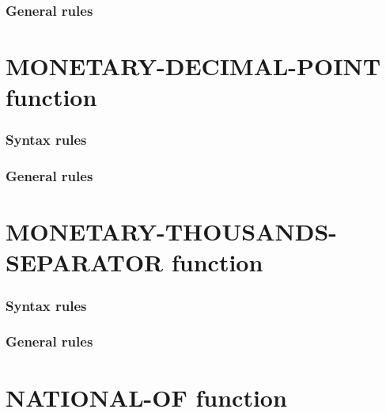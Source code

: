 \subsubsection{General rules}

\section{MONETARY-DECIMAL-POINT function}

\begin{syntax}[\gnucobolcolour]
   
\end{syntax}

\subsubsection{Syntax rules}

\subsubsection{General rules}

\section{MONETARY-THOUSANDS-SEPARATOR function}

\begin{syntax}[\gnucobolcolour]
   
\end{syntax}

\subsubsection{Syntax rules}

\subsubsection{General rules}

\section{NATIONAL-OF function}

\begin{syntax}
\end{syntax}

